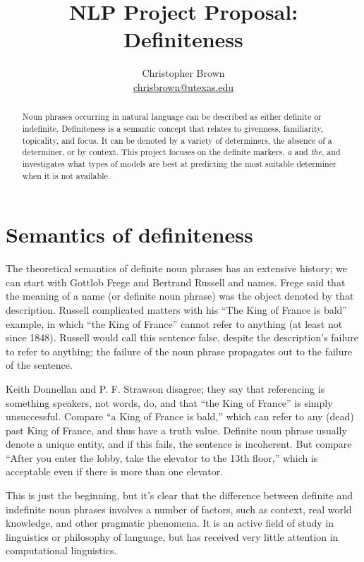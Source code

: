 \documentclass[11pt]{article}
\title{NLP Project Proposal: Definiteness}
\author{Christopher Brown\smallskip\\\href{mailto:chrisbrown@utexas.edu}{chrisbrown@utexas.edu}}
\begin{document}
\maketitle

\begin{abstract}
\noindent
Noun phrases occurring in natural language can be described as either definite or indefinite.
Definiteness is a semantic concept that relates to givenness, familiarity, topicality, and focus.
It can be denoted by a variety of determiners, the absence of a determiner, or by context.
This project focuses on the definite markers, \emph{a} and \emph{the}, and investigates what types of models are best at predicting the most suitable determiner when it is not available.
\end{abstract}

\section{Semantics of definiteness}
The theoretical semantics of definite noun phrases has an extensive history; we can start with Gottlob Frege and Bertrand Russell and names. Frege said that the meaning of a name (or definite noun phrase) was the object denoted by that description. Russell complicated matters with his ``The King of France is bald'' example, in which ``the King of France'' cannot refer to anything (at least not since 1848). Russell would call this sentence false, despite the description's failure to refer to anything; the failure of the noun phrase propagates out to the failure of the sentence.

Keith Donnellan and P. F. Strawson disagree; they say that referencing is something speakers, not words, do, and that ``the King of France'' is simply unsuccessful.
Compare ``a King of France is bald,'' which can refer to any (dead) past King of France, and thus have a truth value. Definite noun phrase usually denote a unique entity, and if this fails, the sentence is incoherent. But compare ``After you enter the lobby, take the elevator to the 13th floor,'' which is acceptable even if there is more than one elevator.

This is just the beginning, but it's clear that the difference between definite and indefinite noun phrases involves a number of factors, such as context, real world knowledge, and other pragmatic phenomena. It is an active field of study in linguistics or philosophy of language, but has received very little attention in computational linguistics.
\end{document}
